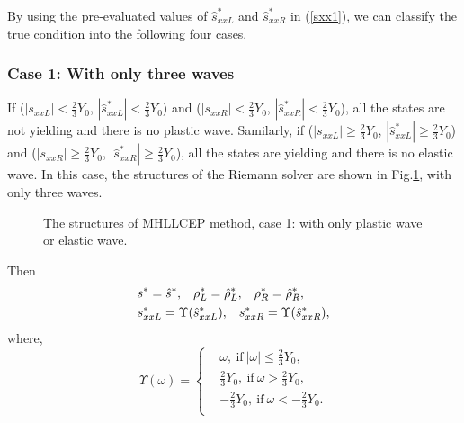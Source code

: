 \documentclass[review]{elsarticle}
\begin{document}
By using the pre-evaluated values of $\hat{s}_{xxL}^*$ and $\hat{s}_{xxR}^*$ in (\ref{sxx1}), we can classify the true condition into the following four cases.


\subsubsection{Case 1: With only three waves}\label{sec:case1}
%
If ($|s_{xxL}|<\frac{2}{3}Y_0$, $|\hat{s}_{xxL}^*| < \frac{2}{3}Y_0$)  and  ($|s_{xxR}|<\frac{2}{3}Y_0$, $|\hat{s}_{xxR}^*| < \frac{2}{3}Y_0$), all the states are not yielding and there is no plastic wave. Samilarly, if ($|s_{xxL}|  \ge \frac{2}{3}Y_0$, $|\hat{s}_{xxL}^*| \ge  \frac{2}{3}Y_0$)  and  ($|s_{xxR}| \ge \frac{2}{3}Y_0$, $|\hat{s}_{xxR}^*| \ge  \frac{2}{3}Y_0$), all the states are yielding and there is no elastic wave.
In this case, the structures  of the Riemann solver are shown in Fig.\ref{fig:case1}, with only three waves.

\begin{figure}[htp]
  \centering
\caption{The  structures of MHLLCEP method, case 1: with only plastic wave or elastic wave.}
\label{fig:case1}
 \end{figure}

Then
\begin{align}
&  s^* = \hat{s}^*,\hspace{0.3cm} \rho^*_L = \hat{\rho}_L^*, \hspace{0.3cm} \rho_R^* = \hat{\rho}_R^*,\\
&  s_{xxL}^*  = \Upsilon(\hat{s}_{xxL}^*),\hspace{0.3cm} s_{xxR}^*  = \Upsilon(\hat{s}_{xxR}^*),
\end{align}
where,
\begin{equation}\label{eq:upsilon}
  \Upsilon(\omega) = \left\{ \begin{aligned}
      &\omega, \  \text{if} \  |\omega| \le \frac{2}{3}Y_0,\\
      &\frac{2}{3}Y_0,  \ \text{if} \  \omega > \frac{2}{3}Y_0,\\
     &-\frac{2}{3}Y_0,  \  \text{if} \ \omega < -\frac{2}{3}Y_0.\\
 \end{aligned}\right.
 \end{equation}
\end{document}

